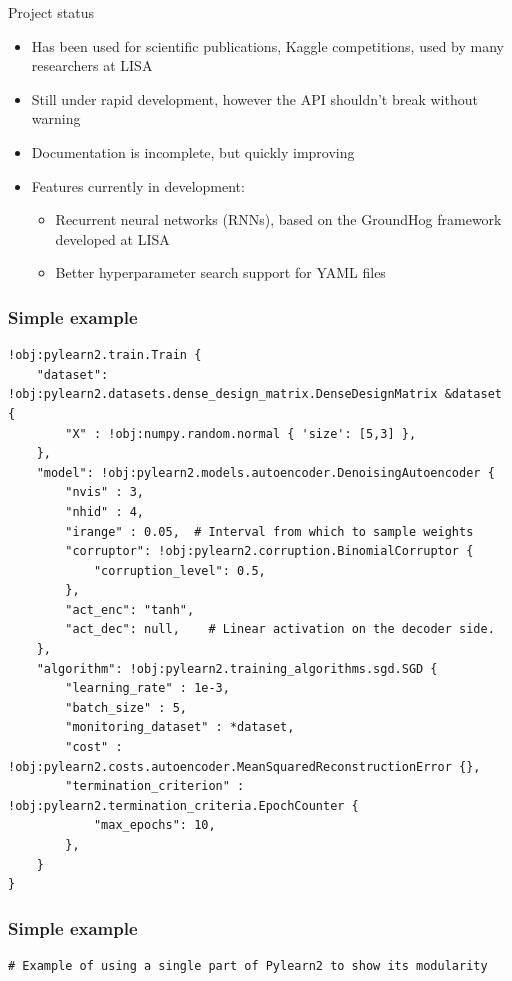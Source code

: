 \documentclass[utf8x,xcolor=pdftex,dvipsnames,table]{beamer}
\begin{document}
\begin{frame}{Project status}
  \begin{itemize}
    \item Has been used for scientific publications, Kaggle competitions, used by many researchers at LISA
    \item Still under rapid development, however the API shouldn't break without warning
    \item Documentation is incomplete, but quickly improving
    \item Features currently in development:
    \begin{itemize}
      \item Recurrent neural networks (RNNs), based on the GroundHog framework developed at LISA
      \item Better hyperparameter search support for YAML files
    \end{itemize}
  \end{itemize}
\end{frame}

\begin{frame}[fragile]
  \frametitle{Simple example}

\begin{lstlisting}
!obj:pylearn2.train.Train {
    "dataset": !obj:pylearn2.datasets.dense_design_matrix.DenseDesignMatrix &dataset {
        "X" : !obj:numpy.random.normal { 'size': [5,3] },
    },
    "model": !obj:pylearn2.models.autoencoder.DenoisingAutoencoder {
        "nvis" : 3,
        "nhid" : 4,
        "irange" : 0.05,  # Interval from which to sample weights
        "corruptor": !obj:pylearn2.corruption.BinomialCorruptor {
            "corruption_level": 0.5,
        },
        "act_enc": "tanh",
        "act_dec": null,    # Linear activation on the decoder side.
    },
    "algorithm": !obj:pylearn2.training_algorithms.sgd.SGD {
        "learning_rate" : 1e-3,
        "batch_size" : 5,
        "monitoring_dataset" : *dataset,
        "cost" : !obj:pylearn2.costs.autoencoder.MeanSquaredReconstructionError {},
        "termination_criterion" : !obj:pylearn2.termination_criteria.EpochCounter {
            "max_epochs": 10,
        },
    }
}
\end{lstlisting}
\end{frame}

\begin{frame}[fragile]
  \frametitle{Simple example}

\begin{lstlisting}
# Example of using a single part of Pylearn2 to show its modularity
\end{lstlisting}
\end{frame}
\end{document}
